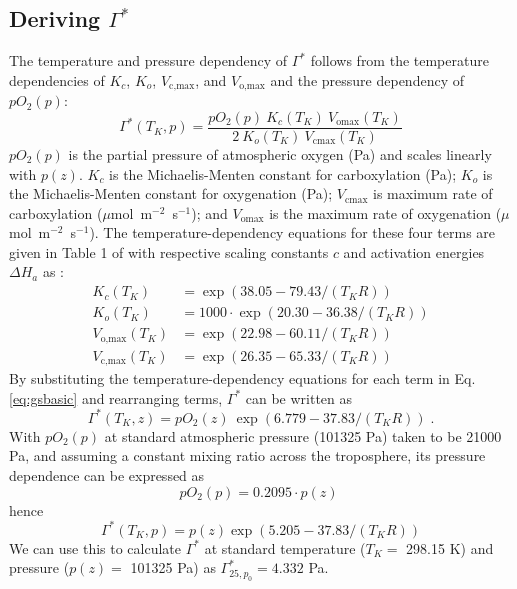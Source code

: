\documentclass[gmd, manuscript]{copernicus}
\begin{document}
\subsection{Deriving $\Gamma^\ast$}
The temperature and pressure dependency of $\Gamma^\ast$ follows from the temperature dependencies of $K_c$, $K_o$, $V_\text{c,max}$, and $V_\text{o,max}$ and the pressure dependency of $pO_2(p)$:
\begin{equation}
\label{eq:gsbasic}
    \Gamma^\ast (T_K, p) = \frac{pO_2(p)\: K_c(T_K)\: V_\text{omax}(T_K)}
                        {2\: K_o(T_K)\: V_\text{cmax}(T_K)}
\end{equation}
$pO_2(p)$ is the partial pressure of atmospheric oxygen (Pa) and scales linearly with $p(z)$. $K_c$ is the Michaelis-Menten constant for carboxylation (Pa); $K_o$ is the Michaelis-Menten constant for oxygenation (Pa); $V_\text{cmax}$ is maximum rate of carboxylation ($\mu$mol~m$^{-2}$~s$^{-1}$); and $V_\text{omax}$ is the maximum rate of oxygenation ($\mu$mol~m$^{-2}$~s$^{-1}$). The temperature-dependency equations for these four terms are given in Table 1 of \citet{bernacchi01} with respective scaling constants $c$ and activation energies $\Delta H_a$ as :
\begin{subequations}
\begin{align}
    K_c(T_K) &= \exp(38.05-79.43/(T_K R)) \\
    K_o(T_K) &= 1000 \cdot \exp(20.30-36.38/(T_K R)) \\
    V_\text{o,max}(T_K) &= \exp(22.98-60.11/(T_K R)) \\
    V_\text{c,max}(T_K) &= \exp(26.35-65.33/(T_K R))
\end{align}
\end{subequations}
By substituting the temperature-dependency equations for each term in Eq. \ref{eq:gsbasic} and rearranging terms, $\Gamma^\ast$ can be written as
\begin{equation}
    \label{eq:gsto}
    \Gamma^\ast(T_K, z) = pO_2(z)\: \exp(6.779-37.83/(T_K R))\;.
\end{equation}
With $pO_2(p)$ at standard atmospheric pressure (101325 Pa) taken to be 21000 Pa, and assuming a constant mixing ratio across the troposphere, its pressure dependence can be expressed as 
\begin{equation}
    \label{eq:oxy}
    pO_2(p) = 0.2095 \cdot p(z)\;
\end{equation}
hence
\begin{equation}
    \label{eq:gstop}
    \Gamma^\ast(T_K, p) = p(z) \exp(5.205-37.83/(T_K R))  %
\end{equation}
We can use this to calculate $\Gamma^\ast$ at standard temperature ($T_K=$ 298.15 K) and pressure ($p(z)=$ 101325 Pa) as $\Gamma^\ast_{25, p_0} = 4.332$ Pa. 
\end{document}

